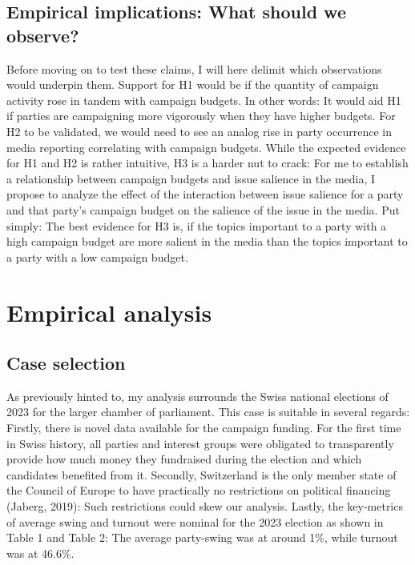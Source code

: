 \documentclass[11pt,a4paper]{article}
\begin{document}
\subsection{Empirical implications: What should we observe?}
Before moving on to test these claims, I will here delimit which observations would underpin them. Support for H1 would be if the quantity of campaign activity rose in tandem with campaign budgets. In other words: It would aid H1 if parties are campaigning more vigorously when they have higher budgets. For H2 to be validated, we would need to see an analog rise in party occurrence in media reporting correlating with campaign budgets. While the expected evidence for H1 and H2 is rather intuitive, H3 is a harder nut to crack: For me to establish a relationship between campaign budgets and issue salience in the media, I propose to analyze the effect of the interaction between issue salience for a party and that party’s campaign budget on the salience of the issue in the media. Put simply: The best evidence for H3 is, if the topics important to a party with a high campaign budget are more salient in the media than the topics important to a party with a low campaign budget.


\section{Empirical analysis}

\subsection{Case selection}
As previously hinted to, my analysis surrounds the Swiss national elections of 2023 for the larger chamber of parliament. This case is suitable in several regards: Firstly, there is novel data available for the campaign funding. For the first time in Swiss history, all parties and interest groups were obligated to transparently provide how much money they fundraised during the election and which candidates benefited from it. Secondly, Switzerland is the only member state of the Council of Europe to have practically no restrictions on political financing (Jaberg, 2019): Such restrictions could skew our analysis. Lastly, the key-metrics of average swing and turnout were nominal for the 2023 election as shown in Table 1 and Table 2: The average party-swing was at around 1\%, while turnout was at 46.6\%.
\end{document}
